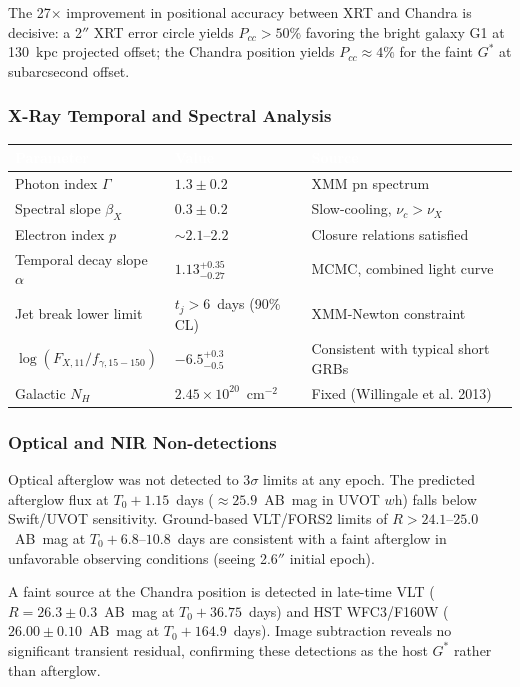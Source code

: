 \documentclass[11pt,letterpaper]{article}
\newcommand{\tableheader}[1]{\textbf{\sffamily\textcolor{white}{#1}}}
\begin{document}
The 27$\times$ improvement in positional accuracy between XRT and Chandra is decisive: a 2$''$ XRT error circle yields $P_{cc} > 50\%$ favoring the bright galaxy G1 at 130~kpc projected offset; the Chandra position yields $P_{cc} \approx 4\%$ for the faint $G^*$ at subarcsecond offset.

\subsubsection{X-Ray Temporal and Spectral Analysis}

\begin{center}
\begin{tabularx}{\textwidth}{L{3.5cm}XC{3cm}}
\toprule
{}
\tableheader{Parameter} & \tableheader{Value} & \tableheader{Source} \\
\midrule
Photon index $\Gamma$ & $1.3 \pm 0.2$ & XMM pn spectrum \\
Spectral slope $\beta_X$ & $0.3 \pm 0.2$ & Slow-cooling, $\nu_c > \nu_X$ \\
Electron index $p$ & $\sim 2.1$--$2.2$ & Closure relations satisfied \\
Temporal decay slope $\alpha$ & $1.13^{+0.35}_{-0.27}$ & MCMC, combined light curve \\
Jet break lower limit & $t_j > 6$~days (90\% CL) & XMM-Newton constraint \\
$\log(F_{X,11}/f_{\gamma,15-150})$ & $-6.5^{+0.3}_{-0.5}$ & Consistent with typical short GRBs \\
Galactic $N_H$ & $2.45 \times 10^{20}$~cm$^{-2}$ & Fixed (Willingale et al. 2013) \\
\bottomrule
\end{tabularx}
\end{center}

\subsubsection{Optical and NIR Non-detections}

Optical afterglow was not detected to 3$\sigma$ limits at any epoch. The predicted afterglow flux at $T_0 + 1.15$~days ($\approx 25.9$~AB~mag in UVOT $w$h) falls below Swift/UVOT sensitivity. Ground-based VLT/FORS2 limits of $R > 24.1$--$25.0$~AB~mag at $T_0 + 6.8$--$10.8$~days are consistent with a faint afterglow in unfavorable observing conditions (seeing 2.6$''$ initial epoch).

A faint source at the Chandra position is detected in late-time VLT ($R = 26.3 \pm 0.3$~AB~mag at $T_0 + 36.75$~days) and HST WFC3/F160W ($26.00 \pm 0.10$~AB~mag at $T_0 + 164.9$~days). Image subtraction reveals no significant transient residual, confirming these detections as the host $G^*$ rather than afterglow.
\end{document}
